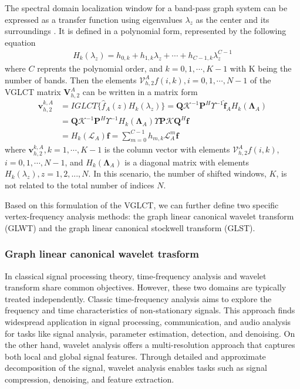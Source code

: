 \documentclass[lettersize,journal]{IEEEtran}
\begin{document}
The spectral domain localization window for a band-pass graph system can be expressed as a transfer function using eigenvalues $\lambda_z$ as the center and its surroundings \cite{stankovic2019vertex, stankovic2020vertex}. It is defined in a polynomial form, represented by the following equation
\begin{align}
	\label{eq6}
	H_k(\lambda_z)=h_{0,k}+h_{1,k}\lambda_z+\cdots+h_{C-1,k}\lambda_z^{C-1}
\end{align}
where $C$ reprents the polynomial order, and $k=0,1,\cdots,K-1$ with K being the number of bands.
Then the elements $\mathcal{V}_{h,2}^Af(i,k), i=0,1,\cdots,N-1$ of the VGLCT matrix $\mathbf{V}_{h,2}^A$ can be written in a matrix form
\begin{align}
	\mathbf{v}_{h,2}^{k,A} 
	&= IGLCT\{ \hat{f}_{A}(z) H_k(\lambda_z)\}
	=  \mathbf{Q} \mathcal{K}^{-1} \mathbf{P}^H \Upsilon^{-1}\hat{\mathbf{f}}_A  H_k(\boldsymbol{\Lambda}_A) \nonumber \\
	&=  \mathbf{Q} \mathcal{K}^{-1} \mathbf{P}^H \Upsilon^{-1}
		H_k(\boldsymbol{\Lambda}_A) 
		\Upsilon \mathbf{P} \mathcal{K} \mathbf{Q}^H \mathbf{f} \nonumber \\
	&=H_k(\mathcal{L}_{A}) \mathbf{f}
	= \sum_{m=0}^{C-1} h_{m,k}\mathcal{L}_{A}^m \mathbf{f}
\end{align}
where $\mathbf{v}_{h,2}^{k,A}, k=1, \cdots, K-1$ is the column vector with elements $\mathcal{V}_{h,2}^Af(i,k)$, $i=0,1,\cdots,N-1$, and $H_k(\boldsymbol{\Lambda}_A) $ is a diagonal matrix with elements $H_k(\lambda_z), z =1, 2,..., N$. In this scenario, the number of shifted windows, $K$, is not related to the total number of indices $N$.

Based on this formulation of the VGLCT, we can further define two specific vertex-frequency analysis methods: the graph linear canonical wavelet transform (GLWT) and the graph linear canonical stockwell transform (GLST).


\subsubsection{Graph linear canonical wavelet trasform}

In classical signal processing theory, time-frequency analysis and wavelet transform share common objectives. However, these two domains are typically treated independently. Classic time-frequency analysis aims to explore the frequency and time characteristics of non-stationary signals. This approach finds widespread application in signal processing, communication, and audio analysis for tasks like signal analysis, parameter estimation, detection, and denoising. On the other hand, wavelet analysis offers a multi-resolution approach that captures both local and global signal features. Through detailed and approximate decomposition of the signal, wavelet analysis enables tasks such as signal compression, denoising, and feature extraction.
\end{document}
